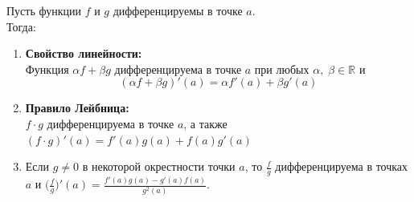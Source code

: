 

\label{sec_Definition07}
\begin{definition}
    Пусть функции $f$ и $g$ дифференцируемы в точке $a$. \\
    Тогда:
    \begin{enumerate}
        \item \textbf{Свойство линейности:} \\
        Функция $\alpha f + \beta g$ дифференцируема в точке $a$ при любых 
        $\alpha, \; \beta \in \mathbb{R}$ и 
        $$ (\alpha f + \beta g)' (a) = \alpha f'(a) + \beta g' (a) $$

        \item \textbf{Правило Лейбница:} \\
        $f \cdot g$ дифференцируема в точке $a$, а также $(f \cdot g)'(a) = f'(a)g(a) + f(a)g'(a)$

        \item Если $g \neq 0$ в некоторой окрестности точки $a$, то $\frac{f}{g}$ дифференцируема
        в точках $a$ и $\big( \frac{f}{g} \big)' (a) = \frac{f'(a)g(a) - g'(a)f(a)}{g^2(a)}$.
    \end{enumerate}
\end{definition}